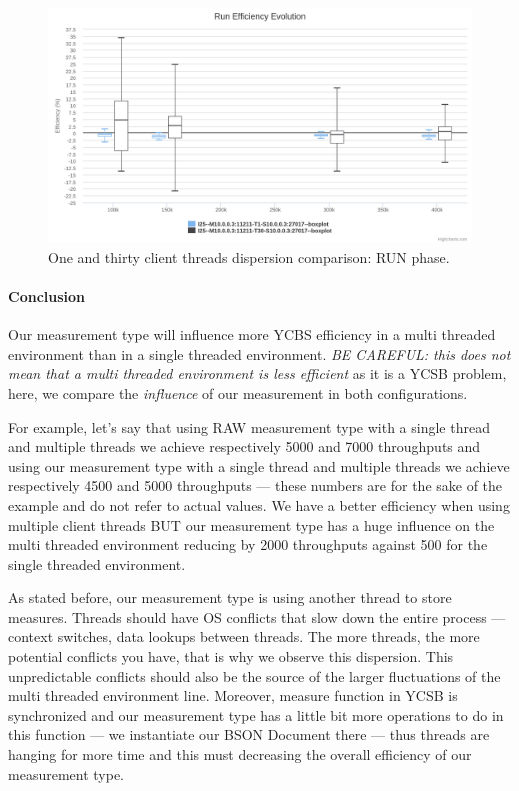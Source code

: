 \documentclass[a4paper,11pt]{report}
\begin{document}
\begin{figure}[ht]
\begin{center}
\includegraphics[width=1\linewidth]{images/evaluation/thread30-SMremote-run.png}
\caption{One and thirty client threads dispersion comparison: RUN phase.}
\label{thread30-SMremote-run}
\end{center}
\end{figure}

\paragraph{Conclusion} Our measurement type will influence more YCBS efficiency in a multi threaded environment than in a single threaded environment. \textit{BE CAREFUL: this does not mean that a multi threaded environment is less efficient} as it is a YCSB problem, here, we compare the \textit{influence} of our measurement in both configurations. 

For example, let's say that using RAW measurement type with a single thread and multiple threads  we achieve respectively 5000 and 7000 throughputs and using our measurement type with a single thread and multiple threads we achieve respectively 4500 and 5000 throughputs --- these numbers are for the sake of the example and do not refer to actual values. We have a better efficiency when using multiple client threads BUT our measurement type has a huge influence on the multi threaded environment reducing by 2000 throughputs against 500 for the single threaded environment.

As stated before, our measurement type is using another thread to store measures. Threads should have OS conflicts that slow down the entire process --- context switches, data lookups between threads. The more threads, the more potential conflicts you have, that is why we observe this dispersion. This unpredictable conflicts should also be the source of the larger fluctuations of the multi threaded environment line.
Moreover, measure function in YCSB is synchronized and our measurement type has a little bit more operations to do in this function --- we instantiate our BSON Document there --- thus threads are hanging for more time and this must decreasing the overall efficiency of our measurement type.
\end{document}
